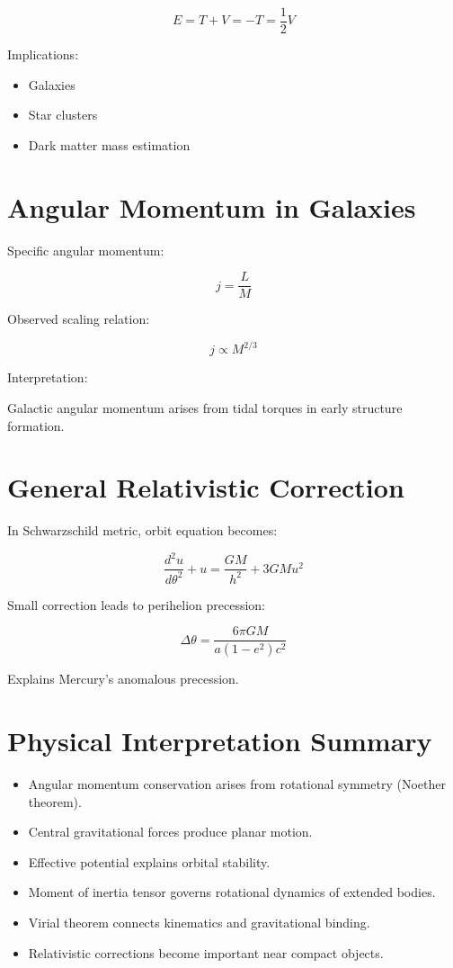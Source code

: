 \documentclass[14pt,a4paper]{article}
\begin{document}
\[
E = T + V = -T = \frac{1}{2}V
\]

Implications:
\begin{itemize}
\item Galaxies
\item Star clusters
\item Dark matter mass estimation
\end{itemize}
\section{Angular Momentum in Galaxies}

Specific angular momentum:

\[
j = \frac{L}{M}
\]

Observed scaling relation:

\[
j \propto M^{2/3}
\]

Interpretation:

Galactic angular momentum arises from tidal torques in early structure formation.

\section{General Relativistic Correction}

In Schwarzschild metric, orbit equation becomes:

\[
\frac{d^2 u}{d\theta^2} + u =
\frac{GM}{h^2} + 3GM u^2
\]

Small correction leads to perihelion precession:

\[
\Delta \theta =
\frac{6\pi GM}{a(1-e^2)c^2}
\]

Explains Mercury's anomalous precession.

\section{Physical Interpretation Summary}

\begin{itemize}
\item Angular momentum conservation arises from rotational symmetry (Noether theorem).
\item Central gravitational forces produce planar motion.
\item Effective potential explains orbital stability.
\item Moment of inertia tensor governs rotational dynamics of extended bodies.
\item Virial theorem connects kinematics and gravitational binding.
\item Relativistic corrections become important near compact objects.
\end{itemize}
\end{document}

